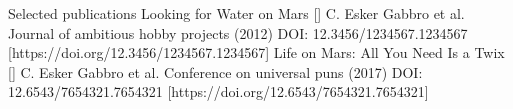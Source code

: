\documentclass[
]{llresume}
\begin{document}
\begin{mainpane}
    \begin{mainsection}
        {Selected publications} %
                \entryPub
                {Looking for Water on Mars} %
                []%
                {C. Esker Gabbro et al.} %
                {Journal of ambitious hobby projects (2012)} %
                {DOI: 12.3456/1234567.1234567} %
                [https://doi.org/12.3456/1234567.1234567] %
                \entryPub
                {Life on Mars: All You Need Is a Twix} %
                []%
                {C. Esker Gabbro et al.} %
                {Conference on universal puns (2017)} %
                {DOI: 12.6543/7654321.7654321} %
                [https://doi.org/12.6543/7654321.7654321] %
    \end{mainsection}


\end{mainpane}
\end{document}
